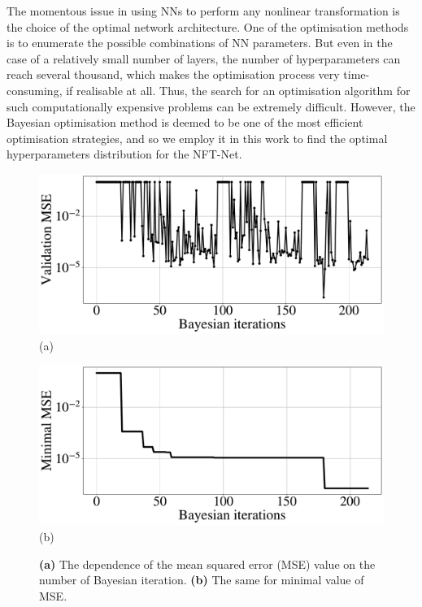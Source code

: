The momentous issue in using NNs to perform any nonlinear transformation is the choice of the optimal network architecture. One of the optimisation methods is to enumerate the possible combinations of NN parameters. But even in the case of a relatively small number of layers, the number of hyperparameters can reach several thousand, which makes the optimisation process very time-consuming, if realisable at all. Thus, the search for an optimisation algorithm for such computationally expensive problems can be extremely difficult. However, the Bayesian optimisation method\cite{pelikan1999boa} is deemed to be one of the most efficient optimisation strategies, and so we employ it in this work to find the optimal hyperparameters distribution for the NFT-Net.



\begin{figure}[t]
\centering
\begin{minipage}{.49\textwidth}
  \centering
  \includegraphics[width=.92\linewidth]{images/nn_nft/scirep_bayes.pdf} (a)
\end{minipage}%
\begin{minipage}{.49\textwidth}
  \centering
  \includegraphics[width=.92\linewidth]{images/nn_nft/scirep_bayes_min.pdf} (b)
\end{minipage}
\caption{\textbf{(a)} The dependence of the mean squared error (MSE) value on the number of Bayesian iteration. \textbf{(b)} The same for minimal value of MSE.}
\label{fig:bayes_full}
\end{figure}


